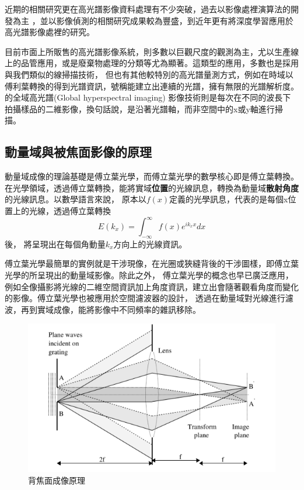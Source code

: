 \documentclass[12pt]{article}
\begin{document}
近期的相關研究更在高光譜影像資料處理有不少突破，過去以影像處裡演算法的開發為主
\cite{manolakis2002detection,nascimento2005vertex}
，並以影像偵測的相關研究成果較為豐盛\cite{manolakis2009there}，到近年更有將深度學習應用於高光譜影像處裡的研究\cite{chen2014deep}。

目前市面上所販售的高光譜影像系統，則多數以巨觀尺度的觀測為主，尤以生產線上的品管應用，或是廢棄物處理的分類等尤為顯著。\cite{useCaseInline}這類型的應用，多數也是採用與我們類似的線掃描技術，
但也有其他較特別的高光譜量測方式，例如\cite{FTHY}在時域以傅利葉轉換的得到光譜資訊，號稱能建立出連續的光譜，擁有無限的光譜解析度。\cite{globalHY}的全域高光譜(Global hyperspectral imaging)
影像技術則是每次在不同的波長下拍攝樣品的二維影像，換句話說，是沿著光譜軸，而非空間中的x或y軸進行掃描。

\subsection{動量域與被焦面影像的原理}\label{sec: bfp}
動量域成像的理論基礎是傅立葉光學，而傅立葉光學的數學核心即是傅立葉轉換。在光學領域，透過傅立葉轉換，能將實域\textbf{位置}的光線訊息，轉換為動量域\textbf{散射角度}的光線訊息。以數學語言來說，
原本以\(f(x)\)定義的光學訊息，代表的是每個x位置上的光線，透過傅立葉轉換\[E(k_x)=\int_{-\infty}^{\infty}f(x)e^{ik_xx}dx\]後，
將呈現出在每個角動量\(k_x\)方向上的光線資訊。

傅立葉光學最簡單的實例就是干涉現像，在光圈或狹縫背後的干涉圖樣，即傅立葉光學的所呈現出的動量域影像。除此之外，
傅立葉光學的概念也早已廣泛應用，例如全像攝影將光線的二維空間資訊加上角度資訊，建立出會隨著觀看角度而變化的影像。傅立葉光學也被應用於空間濾波器的設計，
透過在動量域對光線進行濾波，再到實域成像，能將影像中不同頻率的雜訊移除。
\begin{figure}[h]
    \centering
    \includegraphics[width=\linewidth]{bfp.png}
    \caption{背焦面成像原理\cite{lightfantastic}}
    \label{bfpimage}
\end{figure}
\end{document}
